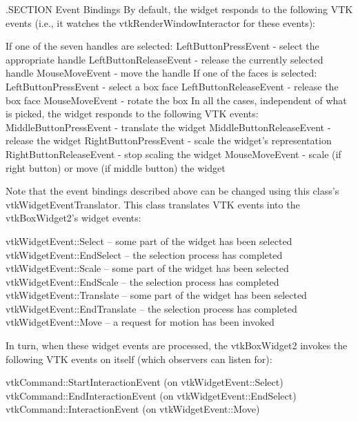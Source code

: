 .S\-E\-C\-T\-I\-O\-N Event Bindings By default, the widget responds to the following V\-T\-K events (i.\-e., it watches the vtk\-Render\-Window\-Interactor for these events)\-: 
\begin{DoxyPre}
 If one of the seven handles are selected:
   LeftButtonPressEvent - select the appropriate handle 
   LeftButtonReleaseEvent - release the currently selected handle 
   MouseMoveEvent - move the handle
 If one of the faces is selected:
   LeftButtonPressEvent - select a box face
   LeftButtonReleaseEvent - release the box face
   MouseMoveEvent - rotate the box
 In all the cases, independent of what is picked, the widget responds to the 
 following VTK events:
   MiddleButtonPressEvent - translate the widget
   MiddleButtonReleaseEvent - release the widget
   RightButtonPressEvent - scale the widget's representation
   RightButtonReleaseEvent - stop scaling the widget
   MouseMoveEvent - scale (if right button) or move (if middle button) the widget
 \end{DoxyPre}


Note that the event bindings described above can be changed using this class's vtk\-Widget\-Event\-Translator. This class translates V\-T\-K events into the vtk\-Box\-Widget2's widget events\-: 
\begin{DoxyPre}
   vtkWidgetEvent::Select -- some part of the widget has been selected
   vtkWidgetEvent::EndSelect -- the selection process has completed
   vtkWidgetEvent::Scale -- some part of the widget has been selected
   vtkWidgetEvent::EndScale -- the selection process has completed
   vtkWidgetEvent::Translate -- some part of the widget has been selected
   vtkWidgetEvent::EndTranslate -- the selection process has completed
   vtkWidgetEvent::Move -- a request for motion has been invoked
 \end{DoxyPre}


In turn, when these widget events are processed, the vtk\-Box\-Widget2 invokes the following V\-T\-K events on itself (which observers can listen for)\-: 
\begin{DoxyPre}
   vtkCommand::StartInteractionEvent (on vtkWidgetEvent::Select)
   vtkCommand::EndInteractionEvent (on vtkWidgetEvent::EndSelect)
   vtkCommand::InteractionEvent (on vtkWidgetEvent::Move)
 \end{DoxyPre}



